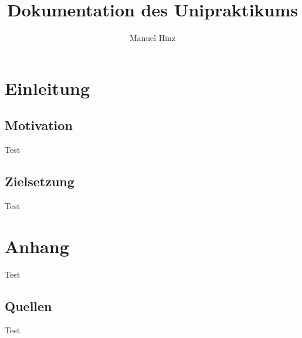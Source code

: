 \documentclass{report}
\author{Manuel Hinz}
\title{Dokumentation des Unipraktikums}
\begin{document}
\maketitle

\tableofcontents
\newpage

\chapter{Einleitung}

\section{Motivation}
Test
\section{Zielsetzung}
Test
\chapter{Anhang}
Test
\section{Quellen}
Test
\end{document}
